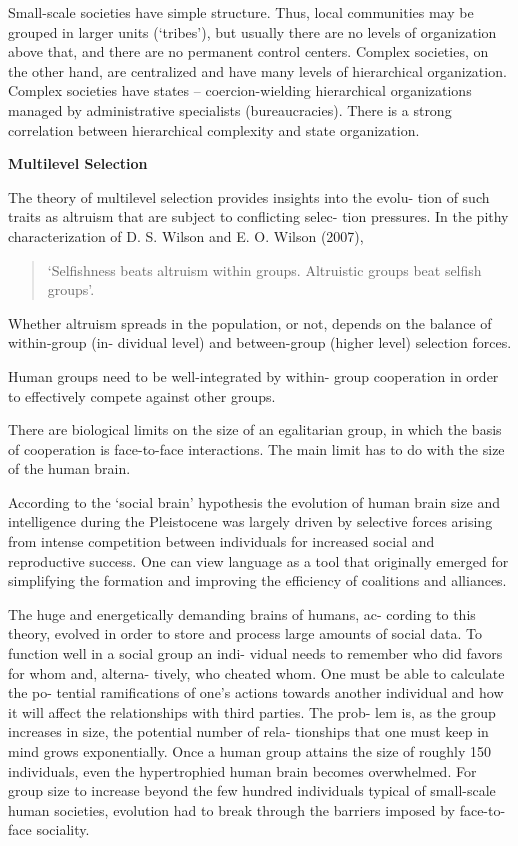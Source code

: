 \documentclass[
]{book}
\begin{document}
Small-scale societies have simple
structure. Thus, local communities may be grouped in larger units
(`tribes'), but usually there are no levels of organization above that,
and there are no permanent control centers. Complex societies, on
the other hand, are centralized and have many levels of hierarchical
organization.
Complex societies have states -- coercion-wielding hierarchical organizations
managed by administrative specialists (bureaucracies).
There is a strong correlation between hierarchical complexity and state organization.

\textbf{Multilevel Selection}

The theory of multilevel selection provides insights into the evolu-
tion of such traits as altruism that are subject to conflicting selec-
tion pressures. In the pithy characterization of D. S. Wilson and
E. O. Wilson (2007),

\begin{quote}
`Selfishness beats altruism within groups.
Altruistic groups beat selfish groups'.
\end{quote}

Whether altruism spreads in
the population, or not, depends on the balance of within-group (in-
dividual level) and between-group (higher level) selection forces.

Human groups need to be well-integrated by within-
group cooperation in order to effectively compete against other
groups.

There are biological limits on the size of an egalitarian group, in
which the basis of cooperation is face-to-face interactions. The main
limit has to do with the size of the human brain.

According to the `social brain' hypothesis the evolution of
human brain size and intelligence during the Pleistocene was
largely driven by selective forces arising from intense competition
between individuals for increased social and reproductive success.
One can view language as a tool that originally emerged for simplifying
the formation and improving the efficiency of coalitions and alliances.

The huge and energetically demanding brains of humans, ac-
cording to this theory, evolved in order to store and process large
amounts of social data. To function well in a social group an indi-
vidual needs to remember who did favors for whom and, alterna-
tively, who cheated whom. One must be able to calculate the po-
tential ramifications of one's actions towards another individual
and how it will affect the relationships with third parties. The prob-
lem is, as the group increases in size, the potential number of rela-
tionships that one must keep in mind grows exponentially.
Once a human group attains the size of roughly 150 individuals,
even the hypertrophied human brain becomes overwhelmed.
For group size to increase beyond the few hundred
individuals typical of small-scale human societies, evolution had to
break through the barriers imposed by face-to-face sociality.
\end{document}
